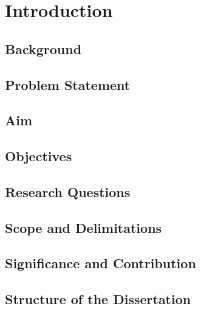 \chapter{Introduction}

\section{Background}

\section{Problem Statement}

\section{Aim}

\section{Objectives}

\section{Research Questions}

\section{Scope and Delimitations}

\section{Significance and Contribution}

\section{Structure of the Dissertation}
